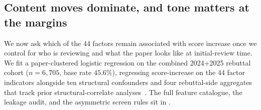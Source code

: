 \documentclass{article}
\begin{document}
\subsection{Content moves dominate, and tone matters at the margins}\label{sec:horizons}

%

We now ask which of the 44 factors remain associated with score increase once we control for who is reviewing and what the paper looks like at initial-review time. We fit a paper-clustered logistic regression on the combined 2024+2025 rebuttal cohort ($n = 6{,}705$, base rate $45.6\%$), regressing score-increase on the 44 factor indicators alongside ten structural confounders and four rebuttal-side aggregates that track prior structural-correlate analyses~\cite{huang,jung,kargaran}. The full feature catalogue, the leakage audit, and the asymmetric screen rules sit in .
\end{document}
